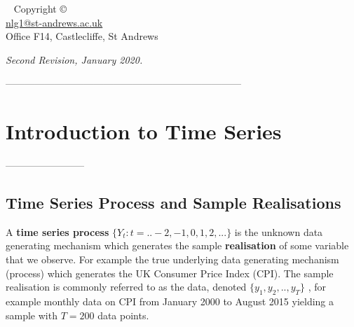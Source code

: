 \documentclass[openany]{tufte-book} %
\begin{document}
\begin{fullwidth}
~\vfill
\thispagestyle{empty}
\setlength{\parindent}{0pt}
\setlength{\parskip}{\baselineskip}
Copyright \copyright\ \the\year\  \\

\href{mailto:nlg1@st-andrews.ac.uk}{nlg1@st-andrews.ac.uk}\\

Office F14, Castlecliffe, St Andrews




\par\textit{Second Revision, January 2020.}
\end{fullwidth}
------------------------------------------------------------------------
\thispagestyle{empty}
\tableofcontents %

\thispagestyle{empty}
\listoffigures %




\mainmatter


\chapter{Introduction to Time Series}
\label{ch:intro}
------------------------

\section{Time Series Process and Sample Realisations} \label{sec:realisation}


A\textbf{ time series process }$\{Y_t : t=..-2,-1,0,1,2,...\}$ is the unknown data generating mechanism  which generates  the sample \textbf{realisation} of some  variable that we observe.  For example the true underlying data generating mechanism (process) which generates the UK Consumer Price Index (CPI).  The sample realisation  is commonly referred to as the data, denoted $\{y_1,y_2,..,y_T\}$ , for example monthly data on CPI from January 2000 to August 2015 yielding a sample with $T=200$ data points.
\end{document}
